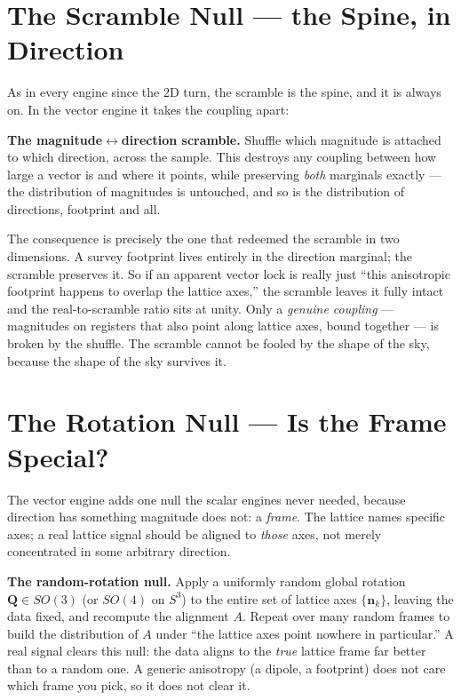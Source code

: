 \documentclass[11pt, letterpaper, openany]{book}
\begin{document}
\section{The Scramble Null --- the Spine, in Direction}

As in every engine since the 2D turn, the scramble is the spine, and it is always on. In the vector engine
it takes the coupling apart:

\begin{derivbox}
\textbf{The magnitude$\leftrightarrow$direction scramble.} Shuffle which magnitude is attached to which
direction, across the sample. This destroys any coupling between how large a vector is and where it points,
while preserving \emph{both} marginals exactly --- the distribution of magnitudes is untouched, and so is
the distribution of directions, footprint and all.
\end{derivbox}

The consequence is precisely the one that redeemed the scramble in two dimensions. A survey footprint lives
entirely in the direction marginal; the scramble preserves it. So if an apparent vector lock is really just
``this anisotropic footprint happens to overlap the lattice axes,'' the scramble leaves it fully intact and
the real-to-scramble ratio sits at unity. Only a \emph{genuine coupling} --- magnitudes on registers that
also point along lattice axes, bound together --- is broken by the shuffle. The scramble cannot be fooled by
the shape of the sky, because the shape of the sky survives it.

\section{The Rotation Null --- Is the Frame Special?}

The vector engine adds one null the scalar engines never needed, because direction has something magnitude
does not: a \emph{frame}. The lattice names specific axes; a real lattice signal should be aligned to
\emph{those} axes, not merely concentrated in some arbitrary direction.

\begin{derivbox}
\textbf{The random-rotation null.} Apply a uniformly random global rotation $\mathbf{Q}\in SO(3)$ (or $SO(4)$
on $S^3$) to the entire set of lattice axes $\{\mathbf{n}_k\}$, leaving the data fixed, and recompute the
alignment $A$. Repeat over many random frames to build the distribution of $A$ under ``the lattice axes point
nowhere in particular.'' A real signal clears this null: the data aligns to the \emph{true} lattice frame far
better than to a random one. A generic anisotropy (a dipole, a footprint) does not care which frame you pick,
so it does not clear it.
\end{derivbox}
\end{document}
